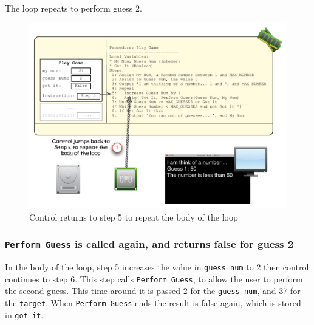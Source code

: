 The loop repeats to perform guess 2.

\begin{figure}[htbp]
   \centering
   \includegraphics[width=\textwidth]{./topics/control-flow/images/PlayGame5} 
   \caption{Control returns to step 5 to repeat the body of the loop}
   \label{fig:play-game-5}
\end{figure}



\clearpage
\subsubsection{\texttt{Perform Guess} is called again, and returns false for guess 2} %
\label{ssub:perform_guess_is_called_to_perform_guess_2}

In the body of the loop, step 5 increases the value in \texttt{guess num} to 2 then control continues to step 6. This step calls \texttt{Perform Guess}, to allow the user to perform the second guess. This time around it is passed 2 for the \texttt{guess num}, and 37 for the \texttt{target}. When \texttt{Perform Guess} ends the result is false again, which is stored in \texttt{got it}.

